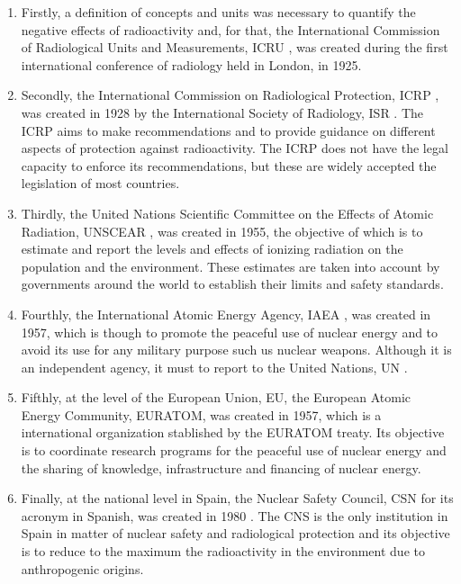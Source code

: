 \begin{enumerate}
\item{} Firstly, a definition of concepts and units was necessary to quantify the negative effects of radioactivity and, for that, the International Commission of Radiological Units and Measurements, ICRU \cite{ICRU}, was created during the first international conference of radiology held in London, in 1925.

\item{} Secondly, the International Commission on Radiological Protection, ICRP \cite{ICRP}, was created in 1928 by the International Society of Radiology, ISR \cite{ISR}. The ICRP aims to make recommendations and to provide guidance on different aspects of protection against radioactivity. The ICRP does not have the legal capacity to enforce its recommendations, but these are widely accepted the legislation of most countries. %

\item{} Thirdly, the United Nations Scientific Committee on the Effects of Atomic Radiation, UNSCEAR \cite{UNSCEAR}, was created in 1955, the objective of which is to estimate and report the levels and effects of ionizing radiation on the population and the environment. These estimates are taken into account by governments around the world to establish their limits and safety standards.

\item{} Fourthly, the International Atomic Energy Agency, IAEA \cite{IAEA}, was created in 1957, which is though to promote the peaceful use of nuclear energy and to avoid its use for any military purpose such us nuclear weapons. Although it is an independent agency, it must to report to the United Nations, UN \cite{UN}.

\item{} Fifthly, at the level of the European Union, EU, the European Atomic Energy Community, EURATOM, was created in 1957, which is a international organization stablished by the EURATOM treaty. Its objective is to coordinate research programs for the peaceful use of nuclear energy and the sharing of knowledge, infrastructure and financing of nuclear energy.

\item{} Finally, at the national level in Spain, the Nuclear Safety Council, CSN for its acronym in Spanish, was created in 1980 \cite{CSN}. The CNS is the only institution in Spain in matter of nuclear safety and radiological protection and its objective is to reduce to the maximum the radioactivity in the environment due to anthropogenic origins.


\end{enumerate}
